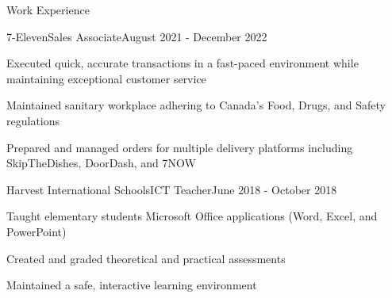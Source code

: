 \documentclass{article}
\newlength{\tabin}
\newlength{\secsep}
\newcommand{\lineunder}{\vspace*{-8pt} \\ \hspace*{-6pt} \hrulefill \\ \vspace*{-15pt}}
\newenvironment{tabbedsection}[1]{
    \begin{list}{}{
        \setlength{\itemsep}{0pt}
        \setlength{\labelsep}{0pt}
        \setlength{\labelwidth}{0pt}
        \setlength{\leftmargin}{\tabin}
        \setlength{\rightmargin}{\tabin}
        \setlength{\listparindent}{0pt}
        \setlength{\parsep}{0pt}
        \setlength{\parskip}{0pt}
        \setlength{\partopsep}{0pt}
        \setlength{\topsep}{#1}
    }
        \item[]
        }{
    \end{list}}
\newenvironment{resume_section}[1]{
    \vspace{2\secsep}
    \textsc{\large#1}
    \lineunder
    \begin{tabbedsection}{\secsep}
    }{\end{tabbedsection}}
\newenvironment{subitems}{
    \renewcommand{\labelitemi}{-}
    \begin{itemize}
        \setlength{\labelsep}{1em}
        }{
    \end{itemize}}
\newenvironment{resume_employer}[4]{
    \filbreak
    \vspace{\secsep}
    \begin{minipage}[t]{0.75\linewidth}
        \textbf{#1}\\
        \small #2
    \end{minipage}%
    \begin{minipage}[t]{0.25\linewidth}
        \hfill \footnotesize #4
    \end{minipage}
    \vspace{0.1em}\\
    \begin{tabbedsection}{0pt}
        \begin{subitems}
        }{\end{subitems}
    \end{tabbedsection}}
\begin{document}
\begin{resume_section}{Work Experience}
        \begin{resume_employer}{7-Eleven}{Sales Associate}{}{August 2021 - December 2022}
            \item Executed quick, accurate transactions in a fast-paced environment while maintaining exceptional customer service
            \item Maintained sanitary workplace adhering to Canada's Food, Drugs, and Safety regulations
            \item Prepared and managed orders for multiple delivery platforms including SkipTheDishes, DoorDash, and 7NOW
        \end{resume_employer}

        \begin{resume_employer}{Harvest International Schools}{ICT Teacher}{}{June 2018 - October 2018}
            \item Taught elementary students Microsoft Office applications (Word, Excel, and PowerPoint)
            \item Created and graded theoretical and practical assessments
            \item Maintained a safe, interactive learning environment
        \end{resume_employer}
    \end{resume_section}
\end{document}
